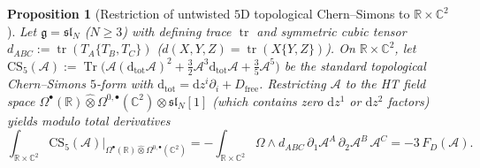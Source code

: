 \documentclass[11pt,letterpaper]{article}
\numberwithin{equation}{section}
\theoremstyle{plain}
\newtheorem{proposition}[theorem]{Proposition}
\theoremstyle{definition}
\theoremstyle{remark}
\newcommand{\dd}{\mathrm{d}}
\newcommand{\fg}{\mathfrak{g}}
\newcommand{\fsl}{\mathfrak{sl}}
\newcommand{\tr}{\operatorname{tr}}
\newcommand{\Tr}{\operatorname{Tr}}
\begin{document}
\begin{proposition}[Restriction of untwisted $5\mathrm{D}$ topological Chern--Simons to $\mathbb{R}\times\mathbb{C}^2$]
\label{prop:cs5-restriction}
Let $\fg = \fsl_N$ ($N \ge 3$) with defining trace $\tr$ and symmetric cubic tensor $d_{ABC} := \tr(T_A\{T_B,T_C\})$ ($d(X,Y,Z) = \tr(X\{Y,Z\})$). On $\mathbb{R}\times\mathbb{C}^2$, let $\mathrm{CS}_5(\mathcal{A}) := \Tr\!\big(\mathcal{A}(\dd_{\mathrm{tot}}\mathcal{A})^2 + \frac{3}{2}\mathcal{A}^3\dd_{\mathrm{tot}}\mathcal{A} + \frac{3}{5}\mathcal{A}^5\big)$ be the standard topological Chern--Simons $5$-form with $\dd_{\mathrm{tot}} = \dd z^i\partial_i + D_{\mathrm{free}}$. Restricting $\mathcal{A}$ to the HT field space $\Omega^\bullet(\mathbb{R})\widehat{\otimes}\Omega^{0,\bullet}(\mathbb{C}^2)\otimes\fsl_N[1]$ (which contains zero $\dd z^1$ or $\dd z^2$ factors) yields modulo total derivatives
\begin{equation}
\label{eq:cs5-to-FD}
\int_{\mathbb{R}\times\mathbb{C}^2}\mathrm{CS}_5(\mathcal{A})\Big|_{\Omega^\bullet(\mathbb{R})\widehat{\otimes}\Omega^{0,\bullet}(\mathbb{C}^2)}
= -\int_{\mathbb{R}\times\mathbb{C}^2}\Omega\wedge d_{ABC}\,\partial_1\mathcal{A}^A\,\partial_2\mathcal{A}^B\,\mathcal{A}^C
= -3\,F_D(\mathcal{A}).
\end{equation}
\end{proposition}
\end{document}
